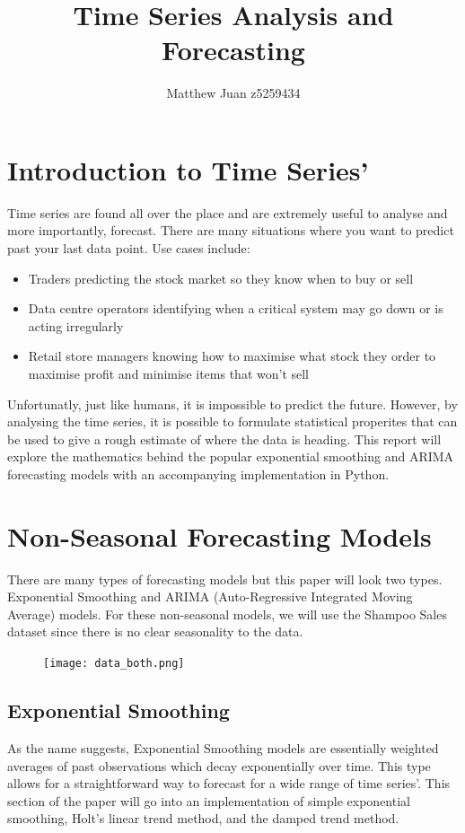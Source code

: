 \documentclass{article}
\title{Time Series Analysis and Forecasting}
\author{Matthew Juan z5259434}
\date{}
\begin{document}
  \maketitle
  \newpage
  \doublespacing
  \tableofcontents
  \singlespacing
  \newpage
  \section{Introduction to Time Series'}
  Time series are found all over the place and are extremely useful to analyse and more importantly, forecast. There are many situations where you want to predict past your last data point. Use cases include:
  \begin{itemize}
    \item Traders predicting the stock market so they know when to buy or sell
    \item Data centre operators identifying when a critical system may go down or is acting irregularly
    \item Retail store managers knowing how to maximise what stock they order to maximise profit and minimise items that won't sell
  \end{itemize}
  Unfortunatly, just like humans, it is impossible to predict the future. However, by analysing the time series, it is possible to formulate statistical properites that can be used to give a rough estimate of where the data is heading. This report will explore the mathematics behind the popular exponential smoothing and ARIMA forecasting models with an accompanying implementation in Python.
  
  \newpage
  
  \section{Non-Seasonal Forecasting Models}
    There are many types of forecasting models but this paper will look two types. Exponential Smoothing and ARIMA (Auto-Regressive Integrated Moving Average) models. For these non-seasonal models, we will use the Shampoo Sales dataset since there is no clear seasonality to the data.
    \begin{figure}[H]
      \texttt{[image: data\_both.png]}
    \end{figure}

  \subsection{Exponential Smoothing}
    As the name suggests, Exponential Smoothing models are essentially weighted averages of past observations which decay exponentially over time. This type allows for a straightforward way to forecast for a wide range of time series'. This section of the paper will go into an implementation of simple exponential smoothing, Holt's linear trend method, and the damped trend method.
  
\end{document}
